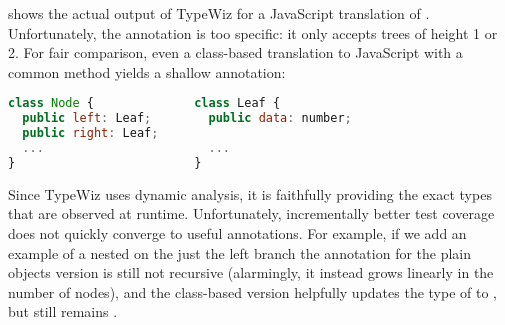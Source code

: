  shows the actual output of TypeWiz for a JavaScript translation of .
Unfortunately, the annotation is too specific: it only accepts trees of height 1 or 2.
For fair comparison, even a class-based translation to JavaScript with
a common  method yields a shallow annotation:
\begin{lstlisting}[language=JavaScript]
class Node {              class Leaf { 
  public left: Leaf;        public data: number;
  public right: Leaf;
  ...                       ...
}                         }
\end{lstlisting}

Since TypeWiz uses dynamic analysis, it is faithfully
providing the exact types that are observed at runtime.
Unfortunately, incrementally better test coverage does not quickly converge
to useful annotations.
For example, if we add an example of a nested 
on the just the left branch
the annotation for the plain objects version is still not recursive (alarmingly, it instead
grows linearly in the number of nodes), and the class-based
version helpfully updates the type of  to ,
but  still remains .


